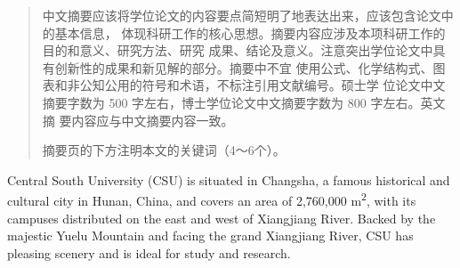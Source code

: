 
\begin{abstract}
  中文摘要应该将学位论文的内容要点简短明了地表达出来，应该包含论文中的基本信息，
  体现科研工作的核心思想。摘要内容应涉及本项科研工作的目的和意义、研究方法、研究
  成果、结论及意义。注意突出学位论文中具有创新性的成果和新见解的部分。摘要中不宜
  使用公式、化学结构式、图表和非公知公用的符号和术语，不标注引用文献编号。硕士学
  位论文中文摘要字数为 500 字左右，博士学位论文中文摘要字数为 800 字左右。英文摘
  要内容应与中文摘要内容一致。

  摘要页的下方注明本文的关键词（4～6个）。
\end{abstract}

\begin{abstract*}
  Central South University (CSU) is situated in Changsha, a famous historical and cultural city in
  Hunan, China, and covers an area of 2,760,000 \si{m^{2}}, with its campuses distributed on the east and west
  of Xiangjiang River. Backed by the majestic Yuelu Mountain and facing the grand Xiangjiang River, CSU
  has pleasing scenery and is ideal for study and research.


\end{abstract*}
